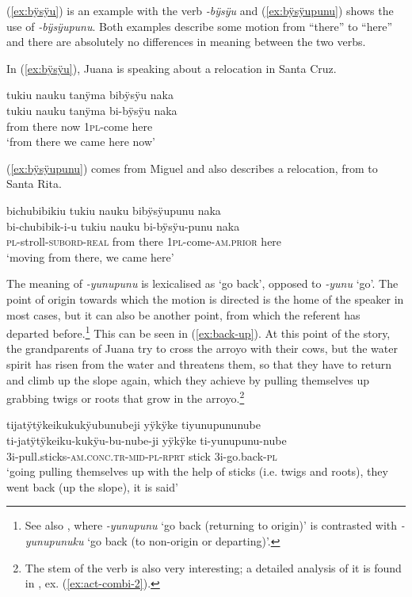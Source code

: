 (\ref{ex:bÿsÿu}) is an example with the verb \textit{-bÿsÿu} and (\ref{ex:bÿsÿupunu}) shows the use of \textit{-bÿsÿupunu}. Both examples describe some motion from “there” to “here” and there are absolutely no differences in meaning between the two verbs.

In (\ref{ex:bÿsÿu}), Juana is speaking about a relocation in Santa Cruz.

\ea\label{ex:bÿsÿu}
\begingl 
\glpreamble tukiu nauku tanÿma bibÿsÿu naka\\
\gla tukiu nauku tanÿma bi-bÿsÿu naka\\ 
\glb from there now 1\textsc{pl}-come here\\ 
\glft ‘from there we came here now’
\trailingcitation{[jxx-p110923l-1.182]}
\xe

(\ref{ex:bÿsÿupunu}) comes from Miguel and also describes a relocation, from  to Santa Rita.

\ea\label{ex:bÿsÿupunu}
\begingl 
\glpreamble bichubibikiu tukiu nauku bibÿsÿupunu naka\\
\gla bi-chubibik-i-u tukiu nauku bi-bÿsÿu-punu naka\\ 
\textsc{pl}-stroll-\textsc{subord}-\textsc{real} from there 1\textsc{pl}-come-\textsc{am.prior} here\\ 
\glft ‘moving from there, we came here’
\trailingcitation{[mxx-p110825l.181]}
\xe


The meaning of \textit{-yunupunu} is lexicalised as ‘go back’, opposed to \textit{-yunu} ‘go’. The point of origin towards which the motion is directed is the home of the speaker in most cases, but it can also be another point, from which the referent has departed before.\footnote{See also , where \textit{-yunupunu} ‘go back (returning to origin)’ is contrasted with \textit{-yunupunuku} ‘go back (to non-origin or departing)’.} 
 This can be seen in (\ref{ex:back-up}). At this point of the story, the grandparents of Juana try to cross the arroyo with their cows, but the water spirit has risen from the water and threatens them, so that they have to return and climb up the slope again, which they achieve by pulling themselves up grabbing twigs or roots that grow in the arroyo.\footnote{The stem of the verb is also very interesting; a detailed analysis of it is found in , ex. (\ref{ex:act-combi-2}).}

\ea\label{ex:back-up}
\begingl 
\glpreamble tijatÿtÿkeikukukÿubunubeji yÿkÿke tiyunupununube\\
\gla ti-jatÿtÿkeiku-kukÿu-bu-nube-ji yÿkÿke ti-yunupunu-nube\\ 
\glb 3i-pull.sticks-\textsc{am.conc.tr}-\textsc{mid}-\textsc{pl}-\textsc{rprt} stick 3i-go.back-\textsc{pl}\\ 
\glft ‘going pulling themselves up with the help of sticks (i.e. twigs and roots), they went back (up the slope), it is said’
\trailingcitation{[jxx-p151016l-2]}
\xe

